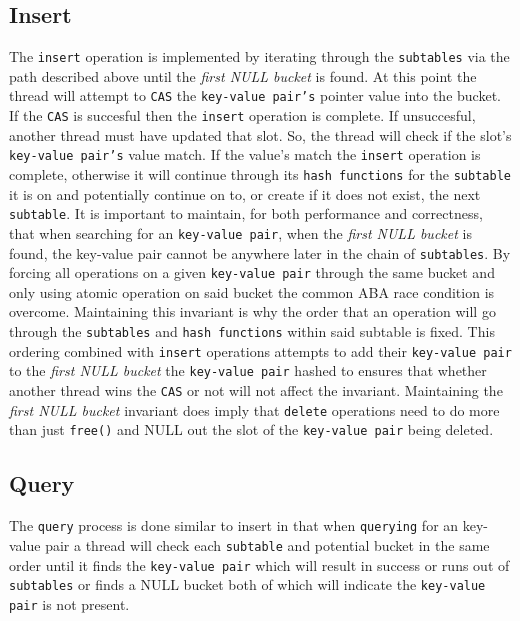 \subsection{Insert}
The \texttt{insert} operation is implemented by iterating through the
\texttt{subtables} via the path described above until the
\textit{first NULL bucket} is found. At this point the thread will
attempt to \texttt{CAS} the \texttt{key-value pair's} pointer value
into the bucket. If the \texttt{CAS} is succesful then the
\texttt{insert} operation is complete. If unsuccesful, another thread
must have updated that slot. So, the thread will check if the slot's
\texttt{key-value pair's} value match. If the value's match the
\texttt{insert} operation is complete, otherwise it will continue
through its \texttt{hash functions} for the \texttt{subtable} it is on
and potentially continue on to, or create if it does not exist, the
next \texttt{subtable}. It is important to maintain, for both
performance and correctness, that when searching for an
\texttt{key-value pair}, when the \textit{first NULL bucket} is found,
the key-value pair cannot be anywhere later in the chain of
\texttt{subtables}. By forcing all operations on a given
\texttt{key-value pair} through the same bucket and only using atomic
operation on said bucket the common ABA race condition is
overcome. Maintaining this invariant is why the order that an
operation will go through the \texttt{subtables} and \texttt{hash
  functions} within said subtable is fixed. This ordering combined
with \texttt{insert} operations attempts to add their
\texttt{key-value pair} to the \textit{first NULL bucket} the
\texttt{key-value pair} hashed to ensures that whether another thread
wins the \texttt{CAS} or not will not affect the
invariant. Maintaining the \textit{first NULL bucket} invariant does
imply that \texttt{delete} operations need to do more than just
\texttt{free()} and NULL out the slot of the \texttt{key-value pair}
being deleted.

\subsection{Query}
The \texttt{query} process is done similar to insert in that when
\texttt{querying} for an key-value pair a thread will check each
\texttt{subtable} and potential bucket in the same order until it
finds the \texttt{key-value pair} which will result in success or runs
out of \texttt{subtables} or finds a NULL bucket both of which will
indicate the \texttt{key-value pair} is not present.

